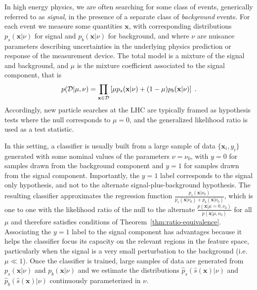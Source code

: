 \documentclass[12pt]{article}
\numberwithin{equation}{section}
\theoremstyle{plain}
\begin{document}
In high energy physics, we are often searching for some class of events,
generically referred to as \textit{signal}, in the presence of a separate class
of \textit{background} events.  For each event we measure some quantities
$\mathbf{x}$, with corresponding distributions $p_s(\mathbf{x}|\nu)$ for signal
and $p_b(\mathbf{x}|\nu)$ for background, and where $\nu$ are nuisance
parameters describing uncertainties in the underlying physics prediction or
response of the measurement device. The total model is a mixture of the signal
and background, and $\mu$ is the mixture coefficient associated to the signal
component, that is
\begin{equation}\label{eq:hepGen}
p( {\cal D} | \mu, \nu) = \prod_{\mathbf{x} \in {\cal D}} \left[ \mu p_s( \mathbf{x} |  \nu)  + (1-\mu) p_b( \mathbf{x} | \nu) \right] \;.
\end{equation}
Accordingly, new particle searches at the LHC are typically framed as
hypothesis tests where the null corresponds to $\mu=0$, and the generalized
likelihood ratio is used as a test statistic.

In this setting, a classifier is usually built from a large sample of data
$\{\mathbf{x}_i, y_i\}$ generated with some nominal values of the parameters
$\nu=\nu_0$, with $y=0$ for samples drawn from the background component and
$y=1$ for samples drawn from the signal component. Importantly, the $y=1$ label
corresponds to the signal only hypothesis, and not to the alternate
signal-plus-background hypothesis. The resulting classifier approximates the
regression function
$\frac{p_s(\mathbf{x}|\nu_0)}{p_s(\mathbf{x}|\nu_0)+p_b(\mathbf{x}|\nu_0)}$, which is
one to one with the likelihood ratio of the null to the alternate
$\frac{p(\mathbf{x}|\mu=0,\nu_0)}{p(\mathbf{x}|\mu,\nu_0)}$ for all $\mu$ and therefore
satisfies conditions of Theorem~\ref{thm:ratio-equivalence}. Associating the
$y=1$ label to the signal component has advantages because it helps the
classifier focus its capacity on the relevant regions in the feature space,
particularly when the signal is a very small perturbation to the background
(i.e. $\mu \ll 1$). Once the classifier is trained, large samples of data are
generated from $p_s(\mathbf{x} | \nu)$ and $p_b(\mathbf{x} | \nu)$ and we
estimate the distributions $\hat{p}_s(\hat s(\mathbf{x}) | \nu)$ and
$\hat{p}_b(\hat s(\mathbf{x}) | \nu)$ continuously parameterized in $\nu$.

\end{document}
